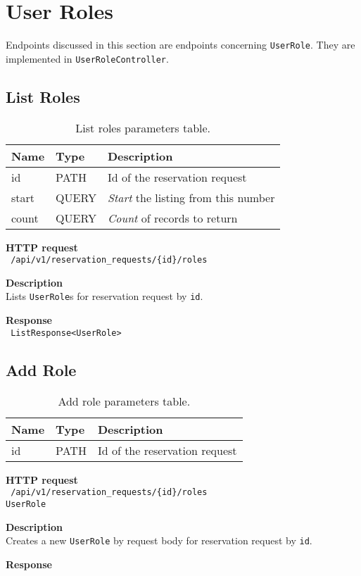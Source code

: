 \section{User Roles}
Endpoints discussed in this section are endpoints concerning \texttt{UserRole}.
They are implemented in \texttt{UserRoleController}.
\subsection{List Roles}
\begin{table}[ht!]
    \begin{tabularx}{\textwidth}{llX}
        \toprule
        Name & Type & Description \\
        \midrule
        id & PATH & Id of the reservation request \\ 
        start & QUERY & \emph{Start} the listing from this number \\  
        count & QUERY & \emph{Count} of records to return
        \end{tabularx}
    \caption{List roles parameters table.}
\end{table}
\begin{description}
    \item \textbf{HTTP request}\\
        \texttt{\text{[GET]} /api/v1/reservation\_requests/\{id\}/roles}
    \item \textbf{Description}\\
        Lists \texttt{UserRole}s for reservation request by \texttt{id}.
    \item \textbf{Response}\\
        \texttt{\text{[200 OK]} ListResponse<UserRole>}
\end{description}
\subsection{Add Role}
\begin{table}[ht!]
    \begin{tabularx}{\textwidth}{llX}
        \toprule
        Name & Type & Description \\
        \midrule
        id & PATH & Id of the reservation request \\ 
        \end{tabularx}
    \caption{Add role parameters table.}
\end{table}
\begin{description}
    \item \textbf{HTTP request}\\
        \texttt{\text{[POST]} /api/v1/reservation\_requests/\{id\}/roles}\\
        \texttt{UserRole}
    \item \textbf{Description}\\
        Creates a new \texttt{UserRole} by request body for reservation request by \texttt{id}.
    \item \textbf{Response}\\
        \texttt{\text{[200 OK]}}
\end{description}
